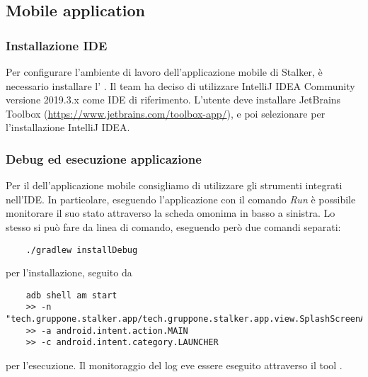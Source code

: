 \documentclass[../../manuale-manutentore.tex]{subfiles}
\begin{document}
\subsection{Mobile application}%
\label{sub:mobile_application}

\subsubsection{Installazione IDE}%
\label{subs:installazione_ide}

Per configurare l'ambiente di lavoro dell'applicazione mobile di Stalker, è necessario installare l' .
Il team ha deciso di utilizzare IntelliJ IDEA Community versione 2019.3.x come IDE di riferimento.
L'utente deve installare JetBrains Toolbox (\href{https://www.jetbrains.com/toolbox-app/}{https://www.jetbrains.com/toolbox-app/}), e poi selezionare per l'installazione IntelliJ IDEA\@.

\subsubsection{Debug ed esecuzione applicazione}%
\label{subs:debug_ed_esecuzione_applicazione}

Per il  dell'applicazione mobile consigliamo di utilizzare gli strumenti integrati nell'IDE\@. In particolare, eseguendo l'applicazione con il comando \textit{Run} è possibile monitorare il suo stato attraverso la scheda omonima in basso a sinistra. Lo stesso si può fare da linea di comando, eseguendo però due comandi separati:

\begin{verbatim}
    ./gradlew installDebug
\end{verbatim}

per l'installazione, seguito da

\begin{verbatim}
    adb shell am start
    >> -n "tech.gruppone.stalker.app/tech.gruppone.stalker.app.view.SplashScreenActivity"
    >> -a android.intent.action.MAIN
    >> -c android.intent.category.LAUNCHER
\end{verbatim}

per l'esecuzione. Il monitoraggio del log eve essere eseguito attraverso il tool .
\end{document}
